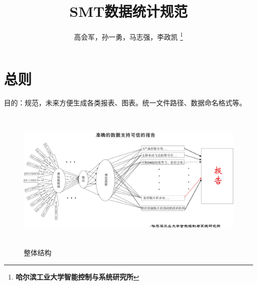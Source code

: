 \documentclass[a4paper,12pt,UTF8]{article}
\begin{document}
\title{SMT数据统计规范}
\author{高会军，孙一勇，马志强，李政凯
\thanks{\textbf{哈尔滨工业大学智能控制与系统研究所}}
\date{\CurrentDate} %
}
\maketitle


\section{总则}
目的：规范，未来方便生成各类报表、图表。统一文件路径、数据命名格式等。

\begin{figure}%
\centering
\includegraphics[width=13.1cm,height=7cm]{SMT_Report_2017.03.10.eps}
\caption{整体结构}
\label{FigLabel_Section1_StructurePicture}
\end{figure}
\end{document}
